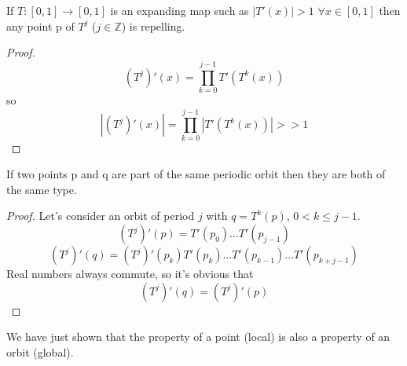 \begin{prop}
    If $T : \left[0,1\right] \to \left[0,1\right]$ is an expanding map such as $\left\lvert T'\left(x\right)\right\rvert > 1$ $\forall x \in \left[0,1\right]$ then any point p of $T^j$ ($j \in \mathbb{Z}$) is repelling.
\end{prop}
\begin{proof}
    $$
        \left(T^j\right)'\left(x\right)=\prod_{k=0}^{j-1}T'\left(T^k\left(x\right)\right)
    $$
    so
    $$
        \left\lvert\left(T^j\right)'\left(x\right)\right\rvert = \prod_{k=0}^{j-1}\left\lvert T'\left(T^k\left(x\right)\right)\right\rvert >> 1
    $$
\end{proof}
\begin{prop}
    If two points p and q are part of the same periodic orbit then they are both of the same type.
\end{prop}
\begin{proof}
    Let's consider an orbit of period $j$ with $q=T^k\left(p\right)$, $0 < k \leq j-1$.
    $$
        \left(T^j\right)'\left(p\right) = T'\left(p_0\right)\ldots T'\left(p_{j-1}\right)
    $$
    $$
        \left(T^j\right)'\left(q\right) = \left(T^j\right)'\left(p_k\right) T'\left(p_k\right)\ldots T'\left(p_{k-1}\right) \ldots T'\left(p_{k+j-1}\right)
    $$
    Real numbers always commute, so it's obvious that
    $$
        \left(T^j\right)'\left(q\right) = \left(T^j\right)'\left(p\right)
    $$
\end{proof}
We have just shown that the property of a point (local) is also a property of an orbit (global).